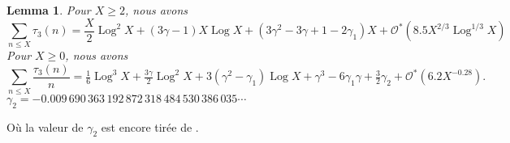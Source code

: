 \documentclass[12pt,a4paper,twoside]{article}
\newtheorem{lem}{Lemma}[section]
\def\Ocal{\mathcal{O}}
\DeclareMathOperator{\Log}{Log}
\begin{document}
\begin{lem}
  Pour $X\ge2$, nous avons
  \begin{equation*}
    \sum_{n\le X}\tau_3(n)=\frac X2\Log^2 X
    +(3\gamma-1)X\Log X +(3\gamma^2-3\gamma+1 -2\gamma_1)X+
    \Ocal^*(8.5 X^{2/3}\Log^{1/3}X)
  \end{equation*}
  Pour $X\ge0$, nous avons
  \begin{equation*}
    \sum_{n\le X}\frac{\tau_3(n)}n=
    \tfrac16\Log^3 X+ \tfrac{3\gamma}2\Log^2 X + 3(\gamma^2-\gamma_1 )\Log X
   +\gamma^3  - 6\gamma_1\gamma+ \tfrac32\gamma_2+\Ocal^*(6.2X^{-0.28}).
  \end{equation*}
  $\gamma_2=-0.009\,690\,363\,192\,872\,318\,484\,530\,386\,035\cdots$
\end{lem}%
O\`u la valeur de $\gamma_2$ est encore tir\'ee de \cite{Keiper*92}.
\end{document}
